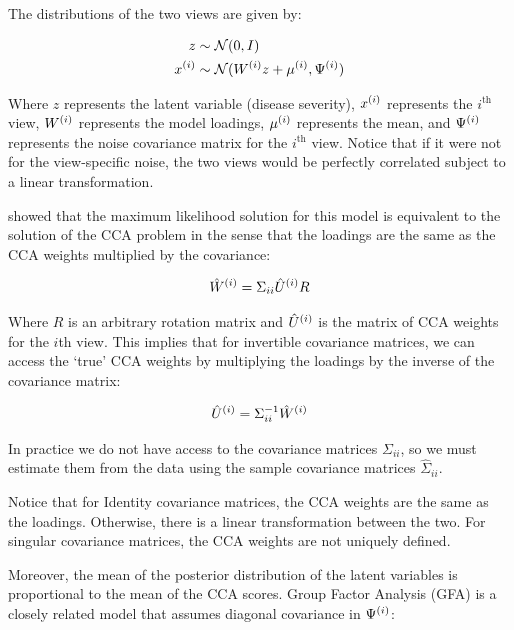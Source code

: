 The distributions of the two views are given by:

\begin{align}
    z& \sim \mathcal{N}(0, I)\\
    x^{(i)} & \sim \mathcal{N}(W^{(i)} z + \mu^{(i)}, \Psi^{(i)})
\end{align}

Where \(z\) represents the latent variable (disease severity), \(x^{(i)}\) represents the $i^{\text{th}}$ view, \(W^{(i)}\) represents the model loadings, \(\mu^{(i)}\) represents the mean, and \(\Psi^{(i)}\) represents the noise covariance matrix for the $i^{\text{th}}$ view.
Notice that if it were not for the view-specific noise, the two views would be perfectly correlated subject to a linear transformation.

\citep{bach2005probabilistic} showed that the maximum likelihood solution for this model is equivalent to the solution of the CCA problem in the sense that the loadings are the same as the CCA weights multiplied by the covariance:

\begin{align}\label{eq:probabilistic-cca}
    \hat{W}^{(i)} = \Sigma_{ii} \hat{U}^{(i)} R
\end{align}

Where $R$ is an arbitrary rotation matrix and $\hat{U}^{(i)}$ is the matrix of CCA weights for the $i$th view.
This implies that for invertible covariance matrices, we can access the `true' CCA weights by multiplying the loadings by the inverse of the covariance matrix:

\begin{align}
    \hat{U}^{(i)} = \Sigma_{ii}^{-1} \hat{W}^{(i)}
\end{align}

In practice we do not have access to the covariance matrices $\Sigma_{ii}$, so we must estimate them from the data using the sample covariance matrices $\hat{\Sigma}_{ii}$.

Notice that for Identity covariance matrices, the CCA weights are the same as the loadings.
Otherwise, there is a linear transformation between the two.
For singular covariance matrices, the CCA weights are not uniquely defined.

Moreover, the mean of the posterior distribution of the latent variables is proportional to the mean of the CCA scores\citep{klami2013bayesian}.
Group Factor Analysis (GFA) is a closely related model that assumes diagonal covariance in $\Psi^{(i)}$:

